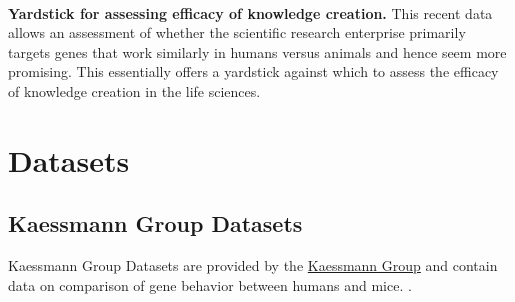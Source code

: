 \documentclass{article}
\begin{document}
\\
\textbf{Yardstick for assessing efficacy of knowledge creation.} This recent data allows an assessment of whether the scientific research enterprise primarily targets genes that work similarly in humans versus animals and hence seem more promising. This essentially offers a yardstick against which to assess the efficacy of knowledge creation in the life sciences.

\section{Datasets}
\subsection{Kaessmann Group Datasets}
\label{kaessmann}
Kaessmann Group Datasets are provided by the \href{https://www.zmbh.uni-heidelberg.de/kaessmann/}{Kaessmann Group} and contain data on comparison of gene behavior between humans and mice. \cite{CardosoMoreira2019GeneEA}.
\end{document}
